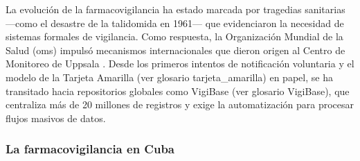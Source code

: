 La evolución de la farmacovigilancia ha estado marcada por tragedias sanitarias —como el desastre de la talidomida en 1961— que evidenciaron la necesidad de sistemas formales de vigilancia\cite{tarrago_farmacovigilancia_cuba_2019,palacios2021talidomida}. 
Como respuesta, la Organización Mundial de la Salud (\gls{oms}) impulsó mecanismos internacionales que dieron origen al Centro de Monitoreo de Uppsala \cite{barrero2022notificacion}. 
Desde los primeros intentos de notificación voluntaria y el modelo de la Tarjeta Amarilla (ver glosario \gls{tarjeta_amarilla}) en papel, se ha transitado hacia repositorios globales como VigiBase (ver glosario \gls{VigiBase}), que centraliza más de 20 millones de registros y exige la automatización para procesar flujos masivos de datos.


\subsubsection*{La farmacovigilancia en Cuba}






